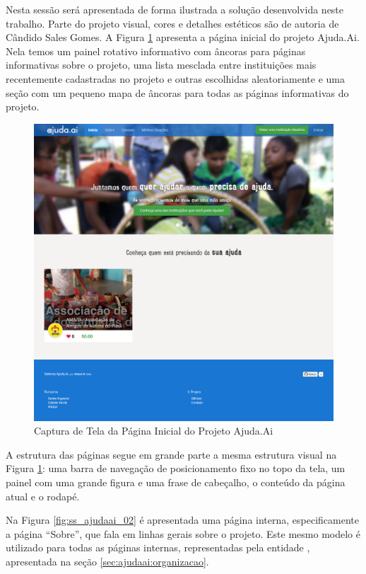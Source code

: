 Nesta sessão será apresentada de forma ilustrada a solução desenvolvida neste trabalho. Parte do projeto visual, cores e detalhes estéticos são de autoria de Cândido Sales Gomes. A Figura \ref{fig:ss_ajudaai_01} apresenta a página inicial do projeto Ajuda.Ai. Nela temos um painel rotativo informativo com âncoras para páginas informativas sobre o projeto, uma lista mesclada entre instituições mais recentemente cadastradas no projeto e outras escolhidas aleatoriamente e uma seção com um pequeno mapa de âncoras para todas as páginas informativas do projeto.

\begin{figure}[H]
	\caption{\label{fig:ss_ajudaai_01}Captura de Tela da Página Inicial do Projeto Ajuda.Ai}
    \centering
    \includegraphics[scale=0.45]{imagens/screenshot-ajudaai-01.png}
\end{figure}

A estrutura das páginas segue em grande parte a mesma estrutura visual na Figura \ref{fig:ss_ajudaai_01}: uma barra de navegação de posicionamento fixo no topo da tela, um painel com uma grande figura e uma frase de cabeçalho, o conteúdo da página atual e o rodapé.

Na Figura \ref{fig:ss_ajudaai_02} é apresentada uma página interna, especificamente a página ``Sobre'', que fala em linhas gerais sobre o projeto. Este mesmo modelo é utilizado para todas as páginas internas, representadas pela entidade , apresentada na seção \ref{sec:ajudaai:organizacao}.


